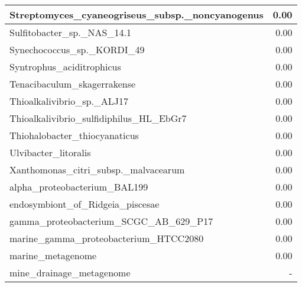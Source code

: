 \documentclass[12pt,a4paper]{article}
\begin{document}
\begin{table}[ht]
\begin{center}
\begin{tabular}{|l*{1}{|r}|}
Streptomyces\_cyaneogriseus\_subsp.\_noncyanogenus & 0.00 \\ \hline
Sulfitobacter\_sp.\_NAS\_14.1 & 0.00 \\ \hline
Synechococcus\_sp.\_KORDI\_49 & 0.00 \\ \hline
Syntrophus\_aciditrophicus & 0.00 \\ \hline
Tenacibaculum\_skagerrakense & 0.00 \\ \hline
Thioalkalivibrio\_sp.\_ALJ17 & 0.00 \\ \hline
Thioalkalivibrio\_sulfidiphilus\_HL\_EbGr7 & 0.00 \\ \hline
Thiohalobacter\_thiocyanaticus & 0.00 \\ \hline
Ulvibacter\_litoralis & 0.00 \\ \hline
Xanthomonas\_citri\_subsp.\_malvacearum & 0.00 \\ \hline
alpha\_proteobacterium\_BAL199 & 0.00 \\ \hline
endosymbiont\_of\_Ridgeia\_piscesae & 0.00 \\ \hline
gamma\_proteobacterium\_SCGC\_AB\_629\_P17 & 0.00 \\ \hline
marine\_gamma\_proteobacterium\_HTCC2080 & 0.00 \\ \hline
marine\_metagenome & 0.00 \\ \hline
mine\_drainage\_metagenome & - \\ \hline
\end{tabular}
\end{center}
\end{table}
\end{document}
